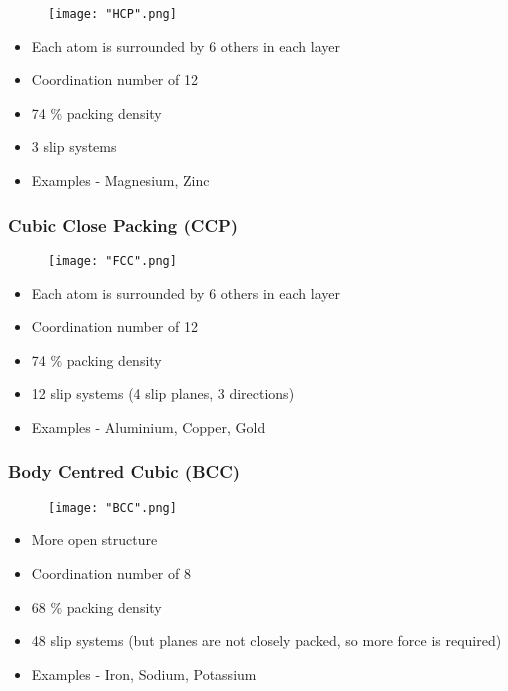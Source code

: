 \documentclass[a4paper, 12pt]{article}
\begin{document}
					\begin{figure}[!ht]
						\texttt{[image: "HCP".png]}
					\end{figure}
					
					\begin{itemize}
						\item Each atom is surrounded by 6 others in each layer
						\item Coordination number of 12
						\item 74 \% packing density
						\item 3 slip systems
						\item Examples - Magnesium, Zinc
					\end{itemize}

				\subsubsection*{Cubic Close Packing (CCP)}
					\begin{figure}[!ht]	
						\texttt{[image: "FCC".png]}
					\end{figure}
					
					\begin{itemize}
						\item Each atom is surrounded by 6 others in each layer
						\item Coordination number of 12
						\item 74 \% packing density
						\item 12 slip systems (4 slip planes, 3 directions)
						\item Examples - Aluminium, Copper, Gold
					\end{itemize}
					
				\subsubsection*{Body Centred Cubic (BCC)}
					\begin{figure}[!ht]
						\texttt{[image: "BCC".png]}
					\end{figure}
					
					\begin{itemize} 
						\item More open structure
						\item Coordination number of 8
						\item 68 \% packing density
						\item 48 slip systems (but planes are not closely packed, so more force is required)
						\item Examples - Iron, Sodium, Potassium
					\end{itemize}
					
\end{document}
